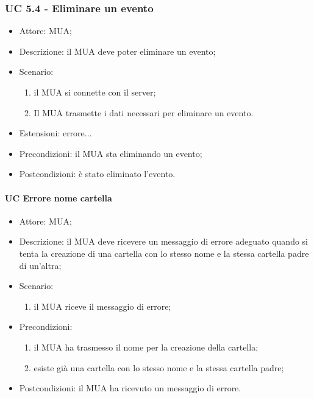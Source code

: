     \subsubsection{UC 5.4 - Eliminare un evento} \label{sec: UC 5.4}
    \begin{itemize}
        \item Attore: MUA;
        \item Descrizione: il MUA deve poter eliminare un evento;
        \item Scenario:
        \begin{enumerate}
        \item il MUA si connette con il server;
        \item Il MUA trasmette i dati necessari per eliminare un evento.
        \end{enumerate}
        \item Estensioni: errore...
        \item Precondizioni: il MUA sta eliminando un evento;
        \item Postcondizioni: è stato eliminato l'evento.
    \end{itemize}




    
    \paragraph{UC Errore nome cartella} \label{sec: UC 11.4.2.1}
    \begin{itemize}
        \item Attore: MUA;
        \item Descrizione: il MUA deve ricevere un messaggio di errore adeguato quando si tenta la creazione di una cartella con lo stesso nome e la stessa cartella padre di un'altra;
        \item Scenario:
        \begin{enumerate}
        \item il MUA riceve il messaggio di errore;
        \end{enumerate}   
        \item Precondizioni: 
        \begin{enumerate}
            \item il MUA ha trasmesso il nome per la creazione della cartella;
            \item esiste già una cartella con lo stesso nome e la stessa cartella padre;
        \end{enumerate}
        \item Postcondizioni: il MUA ha ricevuto un messaggio di errore.
    \end{itemize}

